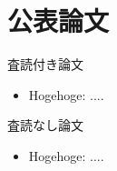 \documentclass[12pt,epsf]{jreport}
\begin{document}
\chapter*{公表論文}

\begin{list}%
 {} %
 {} %
 \item 査読付き論文
       \begin{itemize}
	\item Hogehoge: ....
       \end{itemize}
 \item 査読なし論文
       \begin{itemize}
	\item Hogehoge: ....
       \end{itemize}
\end{list}

\newpage

%
\end{document}
